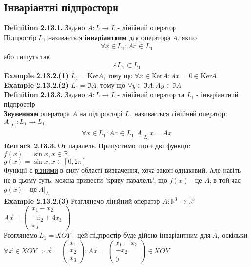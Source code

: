 \documentclass[a4paper, 14pt]{extarticle}
\def\defin#1{\textbf{Definition {#1}}}
\def\ex#1{\textbf{Example {#1}}}
\def\rm#1{\textbf{Remark {#1}}}
\def\bigline{\vspace{5mm}\\}
\begin{document}
\subsection{Інваріантні підпростори}
\defin{2.13.1.} Задано $A: L \to L$ - лінійний оператор\\
Підпростір $L_1$ називається \textbf{інваріантним} для оператора $A$, якщо
\begin{align*}
\forall x \in L_1: Ax \in L_1
\end{align*}
або пишуть так
\begin{align*}
AL_1 \subset L_1
\end{align*}
\ex{2.13.2.(1)} $L_1 = \textrm{Ker} A$, тому що $\forall x \in \textrm{Ker} A: Ax = 0 \in \textrm{Ker} A$\\
\ex{2.13.2.(2)} $L_1 = \Im A$, тому що $\forall y \in \Im A: Ay \in \Im A$
\bigline
\defin{2.13.3.} Задано $A: L \to L$ - лінійний оператор та $L_1$ - інваріантний підпростір\\
\textbf{Звуженням} оператора $A$ на підпросторі $L_1$ називається лінійний оператор: $A |_{L_1}: L_1 \to L_1$
\begin{align*}
\forall x \in L_1: Ax \in L_1: A |_{L_1}x = Ax
\end{align*}
\rm{2.13.3.} От паралель. Припустимо, що є дві функції:\\
$f(x) = \sin x, x \in \mathbb{R}$\\
$g(x) = \sin x, x \in [0,2\pi]$\\
Функції є \underline{різними} в силу області визначення, хоча закон однаковий. Але навіть не в цьому суть: можна привести 'криву паралель', що $f(x)$ - це $A$, в той час $g(x)$ - це $A |_{L_1}$
\bigline
\ex{2.13.2.(3)} Розглянемо лінійний оператор $A: \mathbb{R}^3 \to \mathbb{R}^3$\\
$A \vec{x} = \begin{pmatrix}
x_1 - x_2 \\ -x_2 + 4x_3 \\ x_3
\end{pmatrix}$\\
Розглянемо $L_1 = XOY$ - цей підпростір буде дійсно інваріантним для $A$, оскільки\\
$\forall \vec{x} \in XOY \Rightarrow \vec{x} = \begin{pmatrix}
x_1 \\ x_2 \\ x_3
\end{pmatrix}: A \vec{x} = \begin{pmatrix}
x_1 - x_2 \\ -x_2 \\ 0
\end{pmatrix} \in XOY$\\
\end{document}
